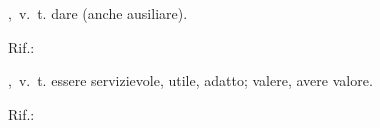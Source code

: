 ,\ v.\ t.
dare (anche ausiliare).
\begin{subvocedue}
\item[Rif.:] 
\end{subvocedue}
,\ v.\ t.
essere servizievole, utile, adatto; valere, avere valore.
\begin{subvocedue}
\item[Rif.:] 
\end{subvocedue}

